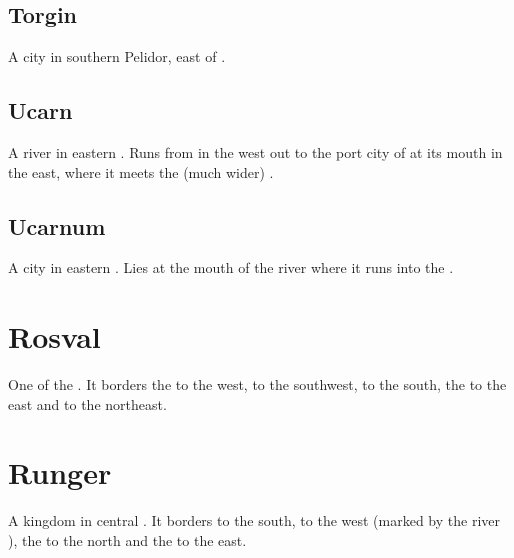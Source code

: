 \subsection{Torgin}
A city in southern Pelidor, east of \Redglen. 









\subsection{Ucarn}
A river in eastern . 
Runs from  in the west out to the port city of  at its mouth in the east, where it meets the (much wider) . 









\subsection{Ucarnum}
A city in eastern . 
Lies at the mouth of the river  where it runs into the . 















\section{Rosval}
One of the . 
It borders the  to the west,  to the southwest,  to the south, the  to the east and  to the northeast. 















\section{Runger}
A kingdom in central . 
It borders  to the south,  to the west (marked by the river ), the  to the north and the  to the east. 

